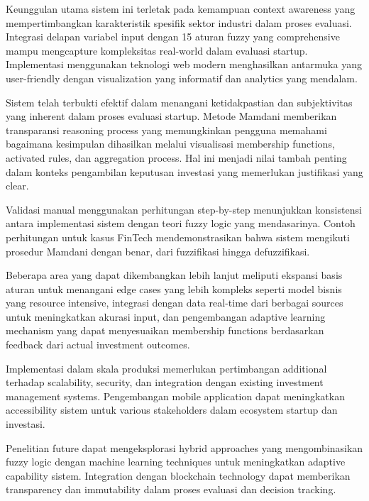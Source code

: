 \documentclass[12pt,a4paper]{article}
\begin{document}
Keunggulan utama sistem ini terletak pada kemampuan context awareness yang mempertimbangkan karakteristik spesifik sektor industri dalam proses evaluasi. Integrasi delapan variabel input dengan 15 aturan fuzzy yang comprehensive mampu mengcapture kompleksitas real-world dalam evaluasi startup. Implementasi menggunakan teknologi web modern menghasilkan antarmuka yang user-friendly dengan visualization yang informatif dan analytics yang mendalam.

Sistem telah terbukti efektif dalam menangani ketidakpastian dan subjektivitas yang inherent dalam proses evaluasi startup. Metode Mamdani memberikan transparansi reasoning process yang memungkinkan pengguna memahami bagaimana kesimpulan dihasilkan melalui visualisasi membership functions, activated rules, dan aggregation process. Hal ini menjadi nilai tambah penting dalam konteks pengambilan keputusan investasi yang memerlukan justifikasi yang clear.

Validasi manual menggunakan perhitungan step-by-step menunjukkan konsistensi antara implementasi sistem dengan teori fuzzy logic yang mendasarinya. Contoh perhitungan untuk kasus FinTech mendemonstrasikan bahwa sistem mengikuti prosedur Mamdani dengan benar, dari fuzzifikasi hingga defuzzifikasi.

Beberapa area yang dapat dikembangkan lebih lanjut meliputi ekspansi basis aturan untuk menangani edge cases yang lebih kompleks seperti model bisnis yang resource intensive, integrasi dengan data real-time dari berbagai sources untuk meningkatkan akurasi input, dan pengembangan adaptive learning mechanism yang dapat menyesuaikan membership functions berdasarkan feedback dari actual investment outcomes.

Implementasi dalam skala produksi memerlukan pertimbangan additional terhadap scalability, security, dan integration dengan existing investment management systems. Pengembangan mobile application dapat meningkatkan accessibility sistem untuk various stakeholders dalam ecosystem startup dan investasi.

Penelitian future dapat mengeksplorasi hybrid approaches yang mengombinasikan fuzzy logic dengan machine learning techniques untuk meningkatkan adaptive capability sistem. Integration dengan blockchain technology dapat memberikan transparency dan immutability dalam proses evaluasi dan decision tracking.
\end{document}
